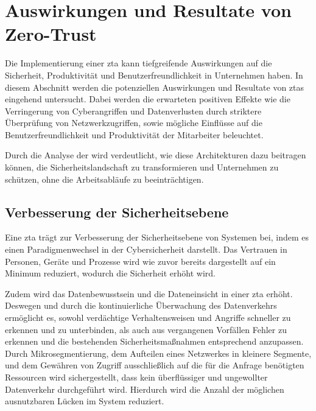 \newpage
\section{Auswirkungen und Resultate von Zero-Trust}\label{sec:auswirkungen-und-resultate-von-zero-trust}
Die Implementierung einer \ac{zta} kann tiefgreifende Auswirkungen auf die Sicherheit, Produktivität und Benutzerfreundlichkeit in Unternehmen haben.
In diesem Abschnitt werden die potenziellen Auswirkungen und Resultate von \acp{zta} eingehend untersucht.
Dabei werden die erwarteten positiven Effekte wie die Verringerung von Cyberangriffen und Datenverlusten durch striktere Überprüfung von Netzwerkzugriffen, sowie mögliche Einflüsse auf die Benutzerfreundlichkeit und Produktivität der Mitarbeiter beleuchtet.

Durch die Analyse der   wird verdeutlicht, wie diese Architekturen dazu beitragen können, die Sicherheitslandschaft zu transformieren und Unternehmen zu schützen, ohne die Arbeitsabläufe zu beeinträchtigen.

\subsection{Verbesserung der Sicherheitsebene}\label{subsec:verbesserung-der-sicherheitsebene}
Eine \ac{zta} trägt zur Verbesserung der Sicherheitsebene von Systemen bei, indem es einen Paradigmenwechsel in der Cybersicherheit darstellt.
Das Vertrauen in Personen, Geräte und Prozesse wird wie zuvor bereits dargestellt auf ein Minimum reduziert, wodurch die Sicherheit erhöht wird.

Zudem wird das Datenbewusstsein und die Dateneinsicht in einer \ac{zta} erhöht.
Deswegen und durch die kontinuierliche Überwachung des Datenverkehrs ermöglicht es, sowohl verdächtige Verhaltensweisen und Angriffe schneller zu erkennen und zu unterbinden, als auch aus vergangenen Vorfällen Fehler zu erkennen und die bestehenden Sicherheitsmaßnahmen entsprechend anzupassen.\autocites[\vglf][]{cunningham-2019}[\vglf][]{buck-2021}
Durch Mikrosegmentierung, dem Aufteilen eines Netzwerkes in kleinere Segmente, und dem Gewähren von Zugriff ausschließlich auf die für die Anfrage benötigten Ressourcen wird sichergestellt, dass kein überflüssiger und ungewollter Datenverkehr durchgeführt wird.\autocite[\vglf][]{shore-2021}
Hierdurch wird die Anzahl der möglichen ausnutzbaren Lücken im System reduziert.

